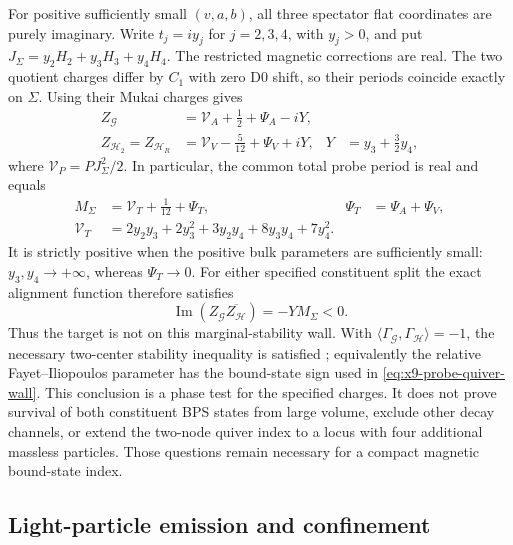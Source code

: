 For positive sufficiently small $(v,a,b)$, all three spectator
flat coordinates are purely imaginary. Write
$t_j=iy_j$ for $j=2,3,4$, with $y_j>0$, and put
$J_\Sigma=y_2H_2+y_3H_3+y_4H_4$. The restricted magnetic
corrections are real. The two quotient charges differ by $C_1$
with zero D0 shift, so their periods coincide exactly on $\Sigma$.
Using their Mukai charges gives
\begin{equation}
 \begin{aligned}
 Z_{\mathcal G}&=\mathcal V_A+\tfrac12+\Psi_A-iY,\\
 Z_{\mathcal H_2}=Z_{\mathcal H_R}
               &=\mathcal V_V-\tfrac5{12}+\Psi_V+iY,
 &Y&=y_3+\tfrac32y_4,
 \end{aligned}
 \label{eq:x9-endpoint-constituent-periods}
\end{equation}
where $\mathcal V_P=PJ_\Sigma^2/2$. In particular, the common
total probe period is real and equals
\begin{equation}
 \begin{aligned}
 M_\Sigma&=\mathcal V_T+\tfrac1{12}+\Psi_T,
 &\Psi_T&=\Psi_A+\Psi_V,\\
 \mathcal V_T&=2y_2y_3+2y_3^2+3y_2y_4+8y_3y_4+7y_4^2.
 \end{aligned}
 \label{eq:x9-endpoint-total-period}
\end{equation}
It is strictly positive when the positive bulk parameters are
sufficiently small: $y_3,y_4\to+\infty$, whereas $\Psi_T\to0$.
For either specified constituent split the exact alignment
function therefore satisfies
\begin{equation}
 \operatorname{Im}(Z_{\mathcal G}\overline{Z_{\mathcal H}})
       =-Y M_\Sigma<0.
 \label{eq:x9-endpoint-phase-sign}
\end{equation}
Thus the target is not on this marginal-stability wall. With
$\langle\Gamma_{\mathcal G},\Gamma_{\mathcal H}\rangle=-1$,
the necessary two-center stability inequality is satisfied
\cite[eq.~(3.23)]{Denef:2007Halos}; equivalently the relative
Fayet--Iliopoulos parameter has the bound-state sign used in
\eqref{eq:x9-probe-quiver-wall}.
This conclusion is a phase test for the specified charges.
It does not prove survival of both constituent BPS states from
large volume, exclude other decay channels, or extend the
two-node quiver index to a locus with four additional massless
particles. Those questions remain necessary for a compact
magnetic bound-state index.

\subsection{Light-particle emission and confinement}
\label{subsec:x9-magnetic-higgs}

